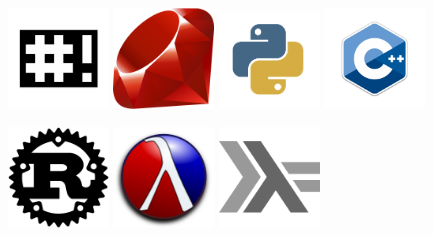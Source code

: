 \begin{frame}
    \frametitle{}

    \begin{center}

        \includegraphics[width=0.2\textwidth]{img/bash.png}
        \includegraphics[width=0.2\textwidth]{img/ruby.png}
        \includegraphics[width=0.2\textwidth]{img/python.png}
        \includegraphics[width=0.2\textwidth]{img/cpp.png}

        \includegraphics[width=0.2\textwidth]{img/rust.png}
        \includegraphics[width=0.2\textwidth]{img/racket.png}
        \includegraphics[width=0.2\textwidth]{img/haskell.png}


\end{center}
\end{frame}

